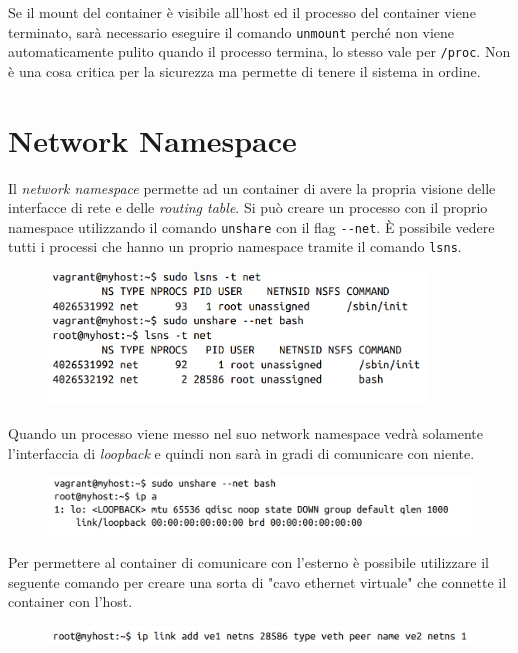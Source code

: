 Se il mount del container è visibile all'host ed il processo del container viene
terminato, sarà necessario eseguire il comando \verb|unmount| perché non viene
automaticamente pulito quando il processo termina, lo stesso vale per \verb|/proc|.
Non è una cosa critica per la sicurezza ma permette di tenere il sistema in ordine.

\section{Network Namespace}

Il \textit{network namespace} permette ad un container di avere la propria visione
delle interfacce di rete e delle \textit{routing table}.
Si può creare un processo con il proprio namespace utilizzando il comando
\verb|unshare| con il flag \verb|--net|.
È possibile vedere tutti i processi che hanno un proprio namespace tramite
il comando \verb|lsns|.

\begin{figure}[H]
    \centering
    \includegraphics[width=10cm, keepaspectratio]{capitoli/os_security/imgs/net1.png}
\end{figure}

Quando un processo viene messo nel suo network namespace vedrà solamente l'interfaccia
di \textit{loopback} e quindi non sarà in gradi di comunicare con niente.

\begin{figure}[H]
    \centering
    \includegraphics[width=12cm, keepaspectratio]{capitoli/os_security/imgs/net2.png}
\end{figure}

Per permettere al container di comunicare con l'esterno è possibile utilizzare
il seguente comando per creare una sorta di "cavo ethernet virtuale" che connette
il container con l'host.

\begin{figure}[H]
    \centering
    \includegraphics[width=12cm, keepaspectratio]{capitoli/os_security/imgs/net3.png}
\end{figure}

